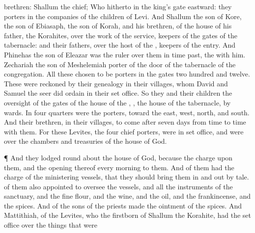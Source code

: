 {brethren:
Shallum
{} the
chief;
Who hitherto
{} in the
king’s
gate
eastward: they
{}
porters in the
companies of the
children of
Levi.
And
Shallum the
son of
Kore, the
son of
Ebiasaph, the
son of
Korah, and his
brethren, of the
house of his
father, the
Korahites,
{} over the
work of the
service,
keepers of the
gates of the
tabernacle: and their
fathers,
{} over the
host of the
{},
{}
keepers of the
entry.
And
Phinehas the
son of
Eleazar was the
ruler over them in time
past,
{} the
{}
{} with him.
Zechariah the
son of
Meshelemiah
{}
porter of the
door of the
tabernacle of the
congregation.
All these
{}
chosen to be
porters in the
gates
{} two
hundred and
twelve. These were reckoned by their
genealogy in their
villages,
whom
David and
Samuel the
seer did
ordain in their set
office.
So they and their
children
{} the oversight of the
gates of the
house of the
{},
{}, the
house of the
tabernacle, by
wards.
In
four
quarters were the
porters, toward the
east,
west,
north, and
south.
And their
brethren,
{} in their
villages,
{} to
come after
seven
days from
time to
time with them.
For these
Levites, the
four
chief
porters, were in
{} set
office, and were over the
chambers and
treasuries of the
house of
God.
\par }{\PP {}¶ And they
lodged round
about the
house of
God, because the
charge
{} upon them, and the
opening thereof every
morning
{} to them.
And
{} of them had the charge
of the
ministering
vessels, that they should bring them
in and
out by
tale.
 of them also
{}
appointed to oversee the
vessels, and all the
instruments of the
sanctuary, and the fine
flour, and the
wine, and the
oil, and the
frankincense, and the
spices.
And
{} of the
sons of the
priests
made the
ointment of the
spices.
And
Mattithiah,
{} of the
Levites, who
{} the
firstborn of
Shallum the
Korahite, had the set
office over the things that were
}
